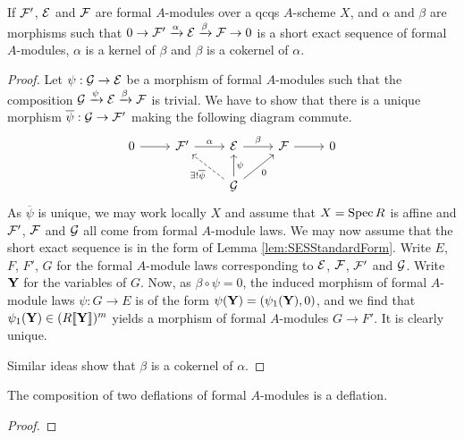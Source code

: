 \documentclass[../main.tex]{subfiles}
\begin{document}
\begin{lem}
  If $\mathcal{F}'$, $\mathcal{E}$ and $\mathcal{F}$ are formal $A$-modules over a qcqs $A$-scheme $X$,
  and $\alpha$ and $\beta$ are morphisms such that 
  $0 \to \mathcal{F}' \xrightarrow{\alpha} \mathcal{E} \xrightarrow{\beta} \mathcal{F} \to 0$ 
  is a short exact sequence of formal $A$-modules, $\alpha$ is a kernel of
  $\beta$ and $\beta$ is a cokernel of $\alpha$. 
\begin{proof}
  Let $\psi: \mathcal{G} \to \mathcal{E}$ be a morphism of formal $A$-modules such that
  the composition $\mathcal{G} \xrightarrow{\psi} \mathcal{E} \xrightarrow{\beta} \mathcal{F}$ is trivial. 
  We have to show that there is a unique morphism $\overline \psi: \mathcal{G} \to 
  \mathcal{F}'$ making the following diagram commute.
  \begin{equation*}
    \begin{tikzcd}[ampersand replacement=\&]
    	0 \& {\cF'} \& \cE \& \cF \& 0 \\
    	\&\& \cG
    	\arrow[from=1-1, to=1-2]
    	\arrow["\alpha", from=1-2, to=1-3]
    	\arrow["\beta", from=1-3, to=1-4]
    	\arrow[from=1-4, to=1-5]
    	\arrow["{\exists!\overline \psi}", dashed, from=2-3, to=1-2]
    	\arrow["{\psi}"', from=2-3, to=1-3]
    	\arrow["0"', from=2-3, to=1-4]
    \end{tikzcd}
  \end{equation*}
  As $\overline \psi$ is unique, we may work locally $X$ and assume that $X =
  \operatorname{Spec} R$ is affine and 
  $\mathcal{F}'$, $\mathcal{F}$ and $\mathcal{G}$ all come from formal $A$-module laws. We may
  now assume that the short exact sequence is in the form of Lemma
  \ref{lem:SESStandardForm}. Write $E$, $F$, $F'$, $G$ for the 
  formal $A$-module laws corresponding to $\mathcal{E}$, $\mathcal{F}$, $\mathcal{F}'$ and 
  $\mathcal{G}$. Write $\mathbf{Y}$ for the variables of $G$. Now, as 
  $\beta \circ \psi = 0$, the induced morphism of
  formal $A$-module laws $\psi: G \to E$ is of the form $\psi(\mathbf{Y}) =
  (\psi_1(\mathbf{Y}), 0)$, and we find that $\psi_1(\mathbf{Y}) \in (R\llbracket \mathbf{Y} \rrbracket)^m$
  yields a morphism of formal $A$-modules $G \to F'$. It is clearly unique. 
  
  Similar ideas show that $\beta$ is a cokernel of $\alpha$. 
\end{proof}

\end{lem}

\begin{lem}
  The composition of two deflations of formal $A$-modules is a deflation.
\begin{proof}
\end{proof}
\end{lem}
\end{document}
